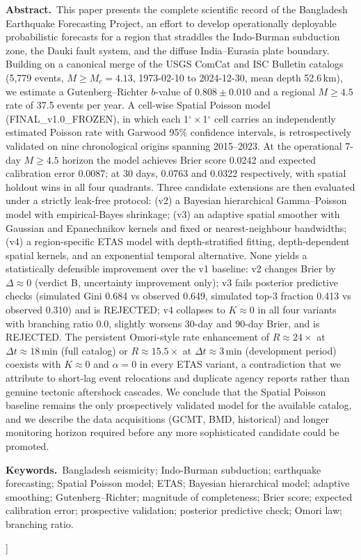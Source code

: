 \documentclass[10pt,a4paper,twocolumn]{article}
\begin{document}
\begin{@twocolumnfalse}
\noindent\textbf{\color{accent}Abstract.}\,%
This paper presents the complete scientific record of the Bangladesh Earthquake Forecasting Project, an effort to develop operationally deployable probabilistic forecasts for a region that straddles the Indo-Burman subduction zone, the Dauki fault system, and the diffuse India--Eurasia plate boundary. Building on a canonical merge of the USGS ComCat and ISC Bulletin catalogs (5{,}779 events, $M\geq M_c=4.13$, 1973-02-10 to 2024-12-30, mean depth 52.6\,km), we estimate a Gutenberg--Richter $b$-value of $0.808\pm0.010$ and a regional $M\geq4.5$ rate of 37.5 events per year. A cell-wise Spatial Poisson model (FINAL\_v1.0\_FROZEN), in which each 1$^\circ\times$1$^\circ$ cell carries an independently estimated Poisson rate with Garwood 95\% confidence intervals, is retrospectively validated on nine chronological origins spanning 2015--2023. At the operational 7-day $M\geq4.5$ horizon the model achieves Brier score 0.0242 and expected calibration error 0.0087; at 30 days, 0.0763 and 0.0322 respectively, with spatial holdout wins in all four quadrants. Three candidate extensions are then evaluated under a strictly leak-free protocol: (v2) a Bayesian hierarchical Gamma--Poisson model with empirical-Bayes shrinkage; (v3) an adaptive spatial smoother with Gaussian and Epanechnikov kernels and fixed or nearest-neighbour bandwidths; (v4) a region-specific ETAS model with depth-stratified fitting, depth-dependent spatial kernels, and an exponential temporal alternative. None yields a statistically defensible improvement over the v1 baseline: v2 changes Brier by $\Delta\approx0$ (verdict B, uncertainty improvement only); v3 fails posterior predictive checks (simulated Gini 0.684 vs observed 0.649, simulated top-3 fraction 0.413 vs observed 0.310) and is REJECTED; v4 collapses to $K\approx0$ in all four variants with branching ratio 0.0, slightly worsens 30-day and 90-day Brier, and is REJECTED. The persistent Omori-style rate enhancement of $R\approx24\times$ at $\Delta t\approx18$\,min (full catalog) or $R\approx15.5\times$ at $\Delta t\approx3$\,min (development period) coexists with $K\approx0$ and $\alpha=0$ in every ETAS variant, a contradiction that we attribute to short-lag event relocations and duplicate agency reports rather than genuine tectonic aftershock cascades. We conclude that the Spatial Poisson baseline remains the only prospectively validated model for the available catalog, and we describe the data acquisitions (GCMT, BMD, historical) and longer monitoring horizon required before any more sophisticated candidate could be promoted.

\vspace{0.4em}
\noindent\textbf{\color{accent}Keywords.}\,%
Bangladesh seismicity; Indo-Burman subduction; earthquake forecasting; Spatial Poisson model; ETAS; Bayesian hierarchical model; adaptive smoothing; Gutenberg--Richter; magnitude of completeness; Brier score; expected calibration error; prospective validation; posterior predictive check; Omori law; branching ratio.
\vspace{1.0em}
\end{@twocolumnfalse}
]
\end{document}
